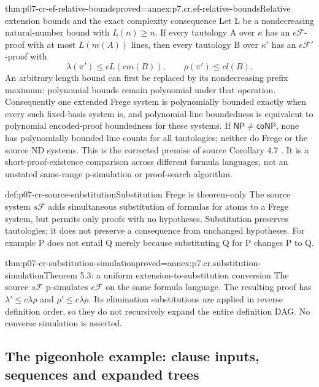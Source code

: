 \begin{hbtheorem}{thm:p07-cr-ef-relative-bounds}{proved=annex:p7.cr.ef-relative-bounds}{Relative extension bounds and the exact complexity consequence}
Let L be a nondecreasing natural-number bound with \(L(n)\geq n\).
If every tautology A over \(\kappa\) has an \(e\mathcal F\)-proof
with at most \(L(m(A))\) lines, then every tautology B over
\(\kappa'\) has an \(e\mathcal F'\)-proof with
\[
 \lambda(\pi')\leq cL(c m(B)),\qquad \rho(\pi')\leq c l(B).
\]
An arbitrary length bound can first be replaced by its nondecreasing
prefix maximum; polynomial bounds remain polynomial under that operation.
Consequently one extended Frege system is polynomially bounded exactly
when every such fixed-basis system is, and polynomial line boundedness
is equivalent to polynomial encoded-proof boundedness for these systems.
If \(\mathsf{NP}\ne\mathsf{coNP}\), none has polynomially bounded
line counts for all tautologies; neither do Frege or the source ND
systems. This is the corrected premise of source Corollary 4.7
\cite{CookReckhow1979,CookReckhow1979AuthorCorrection}.
It is a short-proof-existence comparison across different formula
languages, not an unstated same-range p-simulation or proof-search algorithm.
\end{hbtheorem}

\begin{hbdefinition}{def:p07-cr-source-substitution}{Substitution Frege is theorem-only}
The source system \(s\mathcal F\) adds simultaneous substitution
of formulas for atoms to a Frege system, but permits only proofs with
no hypotheses. Substitution preserves tautologies; it does not preserve
a consequence from unchanged hypotheses. For example P does not entail
Q merely because substituting Q for P changes P to Q.
\end{hbdefinition}

\begin{hbtheorem}{thm:p07-cr-substitution-simulation}{proved=annex:p7.cr.substitution-simulation}{Theorem 5.3: a uniform extension-to-substitution conversion}
The source \(s\mathcal F\) p-simulates \(e\mathcal F\) on the
same formula language. The resulting proof has
\(\lambda'\leq c\lambda\rho\) and
\(\rho'\leq c\lambda\rho\). Its elimination substitutions
are applied in reverse definition order, so they do not recursively
expand the entire definition DAG. No converse simulation is asserted.
\end{hbtheorem}

\subsection{The pigeonhole example: clause inputs, sequences and expanded trees}

